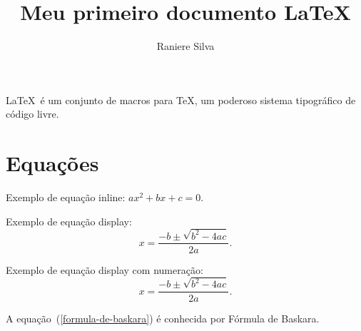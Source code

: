 \documentclass{article}
\title{Meu primeiro documento \LaTeX}
\author{Raniere Silva}
\begin{document}
\maketitle

\LaTeX \ é um conjunto de macros para \TeX, um poderoso sistema tipográfico
de código livre.

\section{Equações}

Exemplo de equação inline: $a x^2 + b x + c = 0$.

Exemplo de equação display: \[x = \frac{-b \pm \sqrt{b^2 - 4 a c}}{2 a}.\]

Exemplo de equação display com numeração:
\begin{equation}
x = \frac{-b \pm \sqrt{b^2 - 4 a c}}{2 a}.
\label{formula-de-baskara}
\end{equation}

A equação~(\ref{formula-de-baskara}) é conhecida por Fórmula de Baskara.
\end{document}
